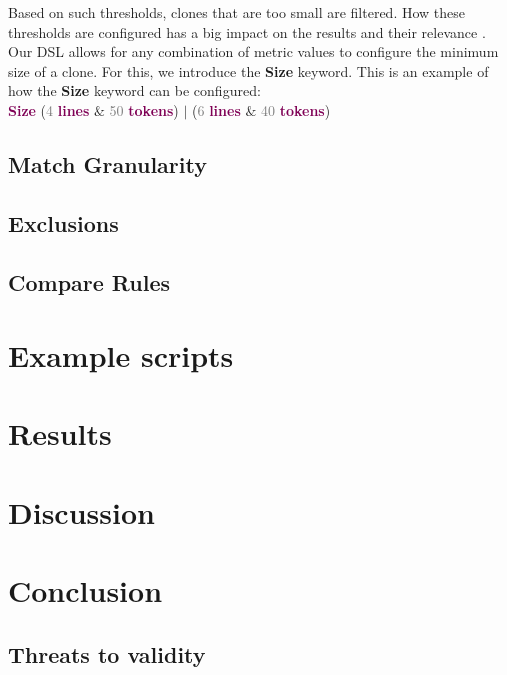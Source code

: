 \documentclass[sigplan,10pt,review,anonymous]{acmart}
\begin{document}
Based on such thresholds, clones that are too small are filtered. How these thresholds are configured has a big impact on the results and their relevance \cite{roy2007survey}. Our DSL allows for any combination of metric values to configure the minimum size of a clone. For this, we introduce the \textbf{Size} keyword. This is an example of how the \textbf{Size} keyword can be configured:
\\
\textbf{\textcolor[HTML]{7F0055}{Size}} (\textcolor[HTML]{7D7D7D}{4} \textbf{\textcolor[HTML]{7F0055}{lines}} $\&$  \textcolor[HTML]{7D7D7D}{50} \textbf{\textcolor[HTML]{7F0055}{tokens}}) $ \vert $  (\textcolor[HTML]{7D7D7D}{6} \textbf{\textcolor[HTML]{7F0055}{lines}} $\&$  \textcolor[HTML]{7D7D7D}{40} \textbf{\textcolor[HTML]{7F0055}{tokens}})
\\


\subsection{Match Granularity}


\subsection{Exclusions}

\subsection{Compare Rules}

\section{Example scripts}

\section{Results}

\section{Discussion}

\section{Conclusion}

\subsection{Threats to validity}
\end{document}
